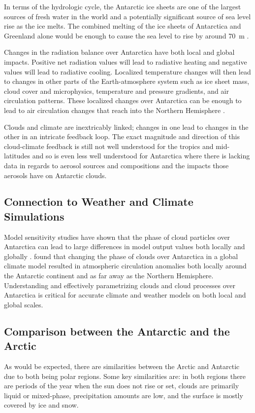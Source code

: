 In terms of the hydrologic cycle, the Antarctic ice sheets are one of the largest sources of fresh water in the world and a potentially significant source of sea level rise as the ice melts. The combined melting of the ice sheets of Antarctica and Greenland alone would be enough to cause the sea level to rise by around \SI{70}{m} \citep{van2011}.

Changes in the radiation balance over Antarctica have both local and global impacts. Positive net radiation values will lead to radiative heating and negative values will lead to radiative cooling. Localized temperature changes will then lead to changes in other parts of the Earth-atmosphere system such as ice sheet mass, cloud cover and microphysics, temperature and pressure gradients, and air circulation patterns. These localized changes over Antarctica can be enough to lead to air circulation changes that reach into the Northern Hemisphere \citep{lubi1997,adhi2012}.

Clouds and climate are inextricably linked; changes in one lead to changes in the other in an intricate feedback loop. The exact magnitude and direction of this cloud-climate feedback is still not well understood for the tropics and mid-latitudes and so is even less well understood for Antarctica where there is lacking data in regards to aerosol sources and compositions and the impacts those aerosols have on Antarctic clouds. \citep{ipcc5}

\subsection{Connection to Weather and Climate Simulations}
Model sensitivity studies have shown that the phase of cloud particles over Antarctica can lead to large differences in model output values both locally and globally \citep[e.g.][]{lubi1997,choi2010,laws2014}. \cite{lubi1997} found that changing the phase of clouds over Antarctica in a global climate model resulted in atmospheric circulation anomalies both locally around the Antarctic continent and as far away as the Northern Hemisphere. Understanding and effectively parametrizing clouds and cloud processes over Antarctica is critical for accurate climate and weather models on both local and global scales.

\subsection{Comparison between the Antarctic and the Arctic}
As would be expected, there are similarities between the Arctic and Antarctic due to both being polar regions. Some key similarities are: in both regions there are periods of the year when the sun does not rise or set, clouds are primarily liquid or mixed-phase, precipitation amounts are low, and the surface is mostly covered by ice and snow. \citep{przy2016,kokh2020}

